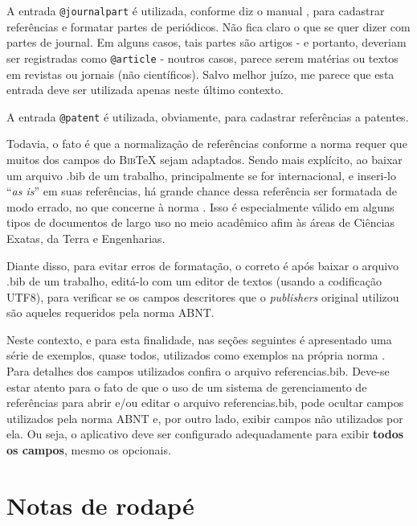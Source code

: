 \begin{apendicesenv}
    A entrada \verb|@journalpart| é utilizada, conforme diz o manual \cite{abnTeX22014d}, para cadastrar referências e formatar partes de periódicos.
    Não fica claro o que se quer dizer com partes de journal.
    Em alguns casos, tais partes são artigos - e portanto, deveriam ser registradas como \verb|@article| - noutros casos, parece serem matérias ou textos em revistas ou jornais (não científicos).
    Salvo melhor juízo, me parece que esta entrada deve ser utilizada apenas neste último contexto.

    A entrada \verb|@patent| é utilizada, obviamente, para cadastrar referências a patentes.

    Todavia, o fato é que a normalização de referências conforme a norma  requer que muitos dos campos do \textsc{Bib}\TeX{} sejam adaptados.
    Sendo mais explícito, ao baixar um arquivo {\color{red} .bib} de um trabalho, principalmente se for internacional, e inseri-lo ``\textit{as is}'' em suas referências, há grande chance dessa referência ser formatada de modo errado, no que concerne à norma .
    Isso é especialmente válido em alguns tipos de documentos de largo uso no meio acadêmico afim às áreas de Ciências Exatas, da Terra e Engenharias.

    Diante disso, para evitar erros de formatação, o correto é após baixar o arquivo {\color{red} .bib} de um trabalho, editá-lo com um editor de textos (usando a codificação UTF8), para verificar se os campos descritores que o \textit{publishers} original utilizou são aqueles requeridos pela norma ABNT.

    Neste contexto, e para esta finalidade, nas seções seguintes é apresentado uma série de exemplos, quase todos, utilizados como exemplos na própria norma .
    Para detalhes dos campos utilizados confira o arquivo {\color{red} referencias.bib}.
    Deve-se estar atento para o fato de que o uso de um sistema de gerenciamento de referências para abrir e/ou editar o arquivo {\color{red} referencias.bib}, pode ocultar campos utilizados pela norma ABNT e, por outro lado, exibir campos não utilizados por ela.
    Ou seja, o aplicativo deve ser configurado adequadamente para exibir \textbf{todos os campos}, mesmo os opcionais.

    \section{Notas de rodapé}
    \label{sec_notas_de_rodape}


\end{apendicesenv}
